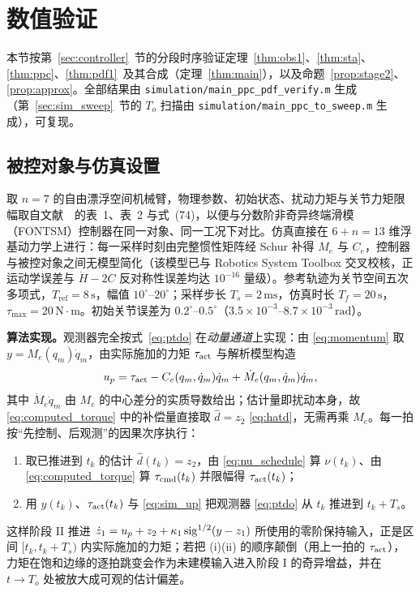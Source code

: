 \section{数值验证}
\label{sec:simulation}

本节按第~\ref{sec:controller}~节的分段时序验证定理~\ref{thm:obs1}、\ref{thm:sta}、\ref{thm:ppc}、\ref{thm:pdf1}~及其合成（定理~\ref{thm:main}），以及命题~\ref{prop:stage2}、\ref{prop:approx}。全部结果由 \texttt{simulation/main\_ppc\_pdf\_verify.m} 生成（第~\ref{sec:sim_sweep}~节的 $T_o$ 扫描由 \texttt{simulation/main\_ppc\_to\_sweep.m} 生成），可复现。

\subsection{被控对象与仿真设置}
\label{sec:sim_model}

取 \(n=7\) 的自由漂浮空间机械臂，物理参数、初始状态、扰动力矩与关节力矩限幅取自文献~\cite{dou2025fractional}~的表~1、表~2 与式~(74)，以便与分数阶非奇异终端滑模（FONTSM）控制器在同一对象、同一工况下对比。仿真直接在 \(6+n=13\) 维浮基动力学上进行：每一采样时刻由完整惯性矩阵经 Schur 补得 \(M_e\) 与 \(C_e\)，控制器与被控对象之间无模型简化（该模型已与 Robotics System Toolbox 交叉校核，正运动学误差与 \(\dot H-2C\) 反对称性误差均达 \(10^{-16}\) 量级）。参考轨迹为关节空间五次多项式，\(T_{\mathrm{ref}}=8\,\mathrm s\)，幅值 \(10^{\circ}\)--\(20^{\circ}\)；采样步长 \(T_s=2\,\mathrm{ms}\)，仿真时长 \(T_f=20\,\mathrm s\)，\(\tau_{\max}=20\,\mathrm{N\cdot m}\)。初始关节误差为 \(0.2^{\circ}\)--\(0.5^{\circ}\)（\(3.5\times10^{-3}\)--\(8.7\times10^{-3}\,\mathrm{rad}\)）。

\textbf{算法实现。}观测器完全按式~\eqref{eq:ptdo} 在\emph{动量通道}上实现：由 \eqref{eq:momentum} 取 \(y=M_e(q_m)\dot q_m\)，由实际施加的力矩 \(\tau_{\rm act}\) 与解析模型构造
\begin{equation}
u_p=\tau_{\rm act}-C_e(q_m,\dot q_m)\dot q_m+\dot M_e(q_m,\dot q_m)\dot q_m,
\label{eq:sim_up}
\end{equation}
其中 \(\dot M_e\dot q_m\) 由 \(M_e\) 的中心差分的实质导数给出；估计量即扰动本身，故 \eqref{eq:computed_torque} 中的补偿量直接取 \(\hat d=z_2\) \eqref{eq:hatd}，无需再乘 \(M_e\)。每一拍按“先控制、后观测”的因果次序执行：

\begin{enumerate}
  \item[\textup{(i)}] 取已推进到 \(t_k\) 的估计 \(\hat d(t_k)=z_2\)，由 \eqref{eq:nu_schedule} 算 \(\nu(t_k)\)、由 \eqref{eq:computed_torque} 算 \(\tau_{\rm cmd}(t_k)\) 并限幅得 \(\tau_{\rm act}(t_k)\)；
  \item[\textup{(ii)}] 用 \(y(t_k)\)、\(\tau_{\rm act}(t_k)\) 与 \eqref{eq:sim_up} 把观测器 \eqref{eq:ptdo} 从 \(t_k\) 推进到 \(t_k+T_s\)。
\end{enumerate}
这样阶段 II 推进 \(\dot z_1=u_p+z_2+\kappa_1\operatorname{sig}^{1/2}(y-z_1)\) 所使用的零阶保持输入，正是区间 \([t_k,t_k+T_s)\) 内实际施加的力矩；若把 \textup{(i)(ii)} 的顺序颠倒（用上一拍的 \(\tau_{\rm act}\)），力矩在饱和边缘的逐拍跳变会作为未建模输入进入阶段 I 的奇异增益，并在 \(t\to T_o\) 处被放大成可观的估计偏差。

